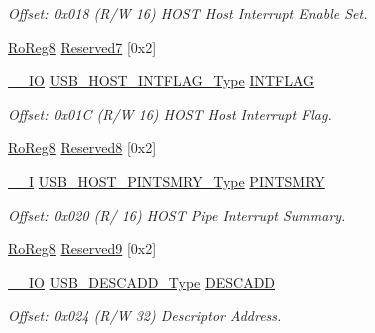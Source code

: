 \begin{DoxyCompactItemize}
\begin{DoxyCompactList}\small\item\em Offset\+: 0x018 (R/W 16) H\+O\+ST Host Interrupt Enable Set. \end{DoxyCompactList}\item 
\mbox{\hyperlink{group___s_a_m_d21_e15_a__definitions_ga0d957f1433aaf5d70e4dc2b68288442d}{Ro\+Reg8}} \mbox{\hyperlink{struct_usb_host_a635230c3dfb24d3467a4d50456a3483c}{Reserved7}} \mbox{[}0x2\mbox{]}
\item 
\mbox{\hyperlink{core__cm0plus_8h_aec43007d9998a0a0e01faede4133d6be}{\+\_\+\+\_\+\+IO}} \mbox{\hyperlink{union_u_s_b___h_o_s_t___i_n_t_f_l_a_g___type}{U\+S\+B\+\_\+\+H\+O\+S\+T\+\_\+\+I\+N\+T\+F\+L\+A\+G\+\_\+\+Type}} \mbox{\hyperlink{struct_usb_host_a5a5d6b646599bd8af79f47b297f5552f}{I\+N\+T\+F\+L\+AG}}
\begin{DoxyCompactList}\small\item\em Offset\+: 0x01C (R/W 16) H\+O\+ST Host Interrupt Flag. \end{DoxyCompactList}\item 
\mbox{\hyperlink{group___s_a_m_d21_e15_a__definitions_ga0d957f1433aaf5d70e4dc2b68288442d}{Ro\+Reg8}} \mbox{\hyperlink{struct_usb_host_a61a0842f78678970cfc266608a1d201e}{Reserved8}} \mbox{[}0x2\mbox{]}
\item 
\mbox{\hyperlink{core__cm0plus_8h_af63697ed9952cc71e1225efe205f6cd3}{\+\_\+\+\_\+I}} \mbox{\hyperlink{union_u_s_b___h_o_s_t___p_i_n_t_s_m_r_y___type}{U\+S\+B\+\_\+\+H\+O\+S\+T\+\_\+\+P\+I\+N\+T\+S\+M\+R\+Y\+\_\+\+Type}} \mbox{\hyperlink{struct_usb_host_aaa834c6a6fd2e59e91fcf7571fe92b0d}{P\+I\+N\+T\+S\+M\+RY}}
\begin{DoxyCompactList}\small\item\em Offset\+: 0x020 (R/ 16) H\+O\+ST Pipe Interrupt Summary. \end{DoxyCompactList}\item 
\mbox{\hyperlink{group___s_a_m_d21_e15_a__definitions_ga0d957f1433aaf5d70e4dc2b68288442d}{Ro\+Reg8}} \mbox{\hyperlink{struct_usb_host_a7dfdc057ed9939b6708cf88cd831a0cc}{Reserved9}} \mbox{[}0x2\mbox{]}
\item 
\mbox{\hyperlink{core__cm0plus_8h_aec43007d9998a0a0e01faede4133d6be}{\+\_\+\+\_\+\+IO}} \mbox{\hyperlink{union_u_s_b___d_e_s_c_a_d_d___type}{U\+S\+B\+\_\+\+D\+E\+S\+C\+A\+D\+D\+\_\+\+Type}} \mbox{\hyperlink{struct_usb_host_a4e4a634e8fbb0f0489872f7a9ee41bc4}{D\+E\+S\+C\+A\+DD}}
\begin{DoxyCompactList}\small\item\em Offset\+: 0x024 (R/W 32) Descriptor Address. \end{DoxyCompactList}\item 

\end{DoxyCompactItemize}
